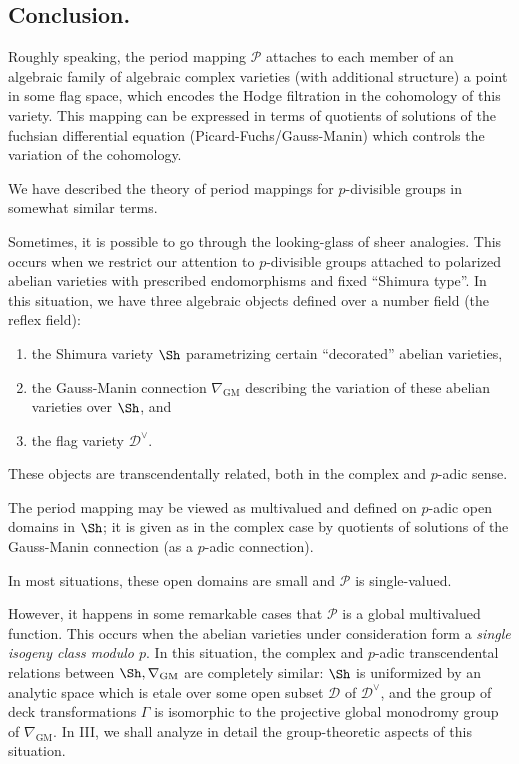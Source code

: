 \subsection{Conclusion.}\label{sub:7.7}

 Roughly speaking, the period mapping $\mathcal{P}$ attaches to
each member of an algebraic family of algebraic complex varieties (with
additional structure) a point in some flag space, which encodes the
Hodge filtration in the cohomology of this variety. This mapping can be
expressed in terms of quotients of solutions of the fuchsian
differential equation (Picard-Fuchs/Gauss-Manin) which controls the
variation of the cohomology.


We have described the theory of period mappings for $p$-divisible groups
in somewhat similar terms.

\bigskip
 Sometimes, it is possible to go through the looking-glass of sheer
 analogies. This occurs when we 
 restrict our attention to $p$-divisible groups attached to polarized
 abelian varieties with prescribed endomorphisms and fixed ``Shimura
 type''. In this situation, we have three algebraic objects defined over
 a number field (the reflex field):

\begin{enumerate}
 \renewcommand{\theenumi}{\alph{enumi}}
 \item the Shimura variety $\Sh$ parametrizing certain
       ``decorated'' abelian varieties,
 \item the Gauss-Manin connection $\nabla_{\mathrm{GM}}$ describing
       the variation of these abelian varieties over $\Sh$, and
 \item the flag variety $\mathcal{D}^\vee$.
\end{enumerate}


 These objects are transcendentally related, both in the complex and
 $p$-adic sense.

 The period mapping may be viewed as
 multivalued and defined on $p$-adic open domains in $\Sh$; it is given
 as in the complex case by quotients of solutions of the Gauss-Manin
 connection (as a $p$-adic connection).


 In most situations, these open domains are small and $\mathcal{P}$ is
 single-valued.


 However, it happens in some remarkable cases that $\mathcal{P}$ is a
 global multivalued function. This occurs when the abelian varieties
 under consideration form a {\it single isogeny class modulo $p$}. In
 this situation, the complex and $p$-adic transcendental relations
 between $\Sh, \nabla_{\mathrm{GM}}$ are completely similar: $\Sh$ is
 uniformized 
 by an analytic space which is etale over some open subset $\mathcal{D}$
 of $\mathcal{D}^{\vee}$, and the group of deck transformations $\Gamma$
 is isomorphic to the projective global monodromy group of
 $\nabla_{\mathrm{GM}}$.  In III, we shall analyze in detail the
 group-theoretic 
 aspects of this situation.

